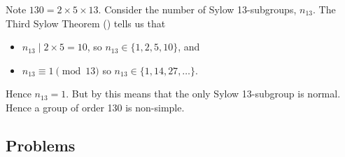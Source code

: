 \begin{questions}
    \item Note $130 = 2 \times 5 \times 13$. Consider the number of Sylow 13-subgroups, $n_{13}$. The Third Sylow Theorem () tells us that
    \begin{itemize}
        \item $n_{13} \mid 2 \times 5 = 10$, so $n_{13} \in \{1, 2, 5, 10\}$, and
        \item $n_{13} \equiv 1 \pmod{13}$ so $n_{13} \in \{1, 14, 27, \dots\}$.
    \end{itemize}
    Hence $n_{13} = 1$. But by  this means that the only Sylow 13-subgroup is normal. Hence a group of order 130 is non-simple.
\end{questions}

\subsection*{Problems}
